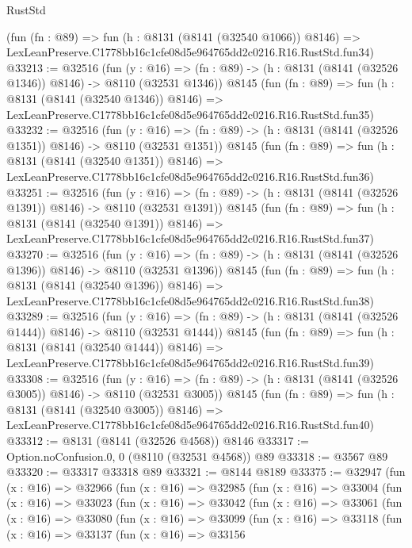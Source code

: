 \begin{lexlean}{RustStd}
\begin{coremodule}
    (fun (fn : @89) =>
    fun (h : @8131 (@8141 (@32540 @1066)) @8146) =>
    LexLeanPreserve.C1778bb16c1cfe08d5e964765dd2c0216.R16.RustStd.fun34)
@33213 := @32516
    (fun (y : @16) =>
    (fn : @89) -> (h : @8131 (@8141 (@32526 @1346)) @8146) -> @8110 (@32531 @1346))
    @8145
    (fun (fn : @89) =>
    fun (h : @8131 (@8141 (@32540 @1346)) @8146) =>
    LexLeanPreserve.C1778bb16c1cfe08d5e964765dd2c0216.R16.RustStd.fun35)
@33232 := @32516
    (fun (y : @16) =>
    (fn : @89) -> (h : @8131 (@8141 (@32526 @1351)) @8146) -> @8110 (@32531 @1351))
    @8145
    (fun (fn : @89) =>
    fun (h : @8131 (@8141 (@32540 @1351)) @8146) =>
    LexLeanPreserve.C1778bb16c1cfe08d5e964765dd2c0216.R16.RustStd.fun36)
@33251 := @32516
    (fun (y : @16) =>
    (fn : @89) -> (h : @8131 (@8141 (@32526 @1391)) @8146) -> @8110 (@32531 @1391))
    @8145
    (fun (fn : @89) =>
    fun (h : @8131 (@8141 (@32540 @1391)) @8146) =>
    LexLeanPreserve.C1778bb16c1cfe08d5e964765dd2c0216.R16.RustStd.fun37)
@33270 := @32516
    (fun (y : @16) =>
    (fn : @89) -> (h : @8131 (@8141 (@32526 @1396)) @8146) -> @8110 (@32531 @1396))
    @8145
    (fun (fn : @89) =>
    fun (h : @8131 (@8141 (@32540 @1396)) @8146) =>
    LexLeanPreserve.C1778bb16c1cfe08d5e964765dd2c0216.R16.RustStd.fun38)
@33289 := @32516
    (fun (y : @16) =>
    (fn : @89) -> (h : @8131 (@8141 (@32526 @1444)) @8146) -> @8110 (@32531 @1444))
    @8145
    (fun (fn : @89) =>
    fun (h : @8131 (@8141 (@32540 @1444)) @8146) =>
    LexLeanPreserve.C1778bb16c1cfe08d5e964765dd2c0216.R16.RustStd.fun39)
@33308 := @32516
    (fun (y : @16) =>
    (fn : @89) -> (h : @8131 (@8141 (@32526 @3005)) @8146) -> @8110 (@32531 @3005))
    @8145
    (fun (fn : @89) =>
    fun (h : @8131 (@8141 (@32540 @3005)) @8146) =>
    LexLeanPreserve.C1778bb16c1cfe08d5e964765dd2c0216.R16.RustStd.fun40)
@33312 := @8131 (@8141 (@32526 @4568)) @8146
@33317 := Option.noConfusion.{0, 0} (@8110 (@32531 @4568)) @89
@33318 := @3567 @89
@33320 := @33317 @33318 @89
@33321 := @8144 @8189
@33375 := @32947
    (fun (x : @16) =>
    @32966
      (fun (x : @16) =>
      @32985
        (fun (x : @16) =>
        @33004
          (fun (x : @16) =>
          @33023
            (fun (x : @16) =>
            @33042
              (fun (x : @16) =>
              @33061
                (fun (x : @16) =>
                @33080
                  (fun (x : @16) =>
                  @33099
                    (fun (x : @16) =>
                    @33118
                      (fun (x : @16) =>
                      @33137
                        (fun (x : @16) =>
                        @33156

\end{coremodule}
\end{lexlean}
